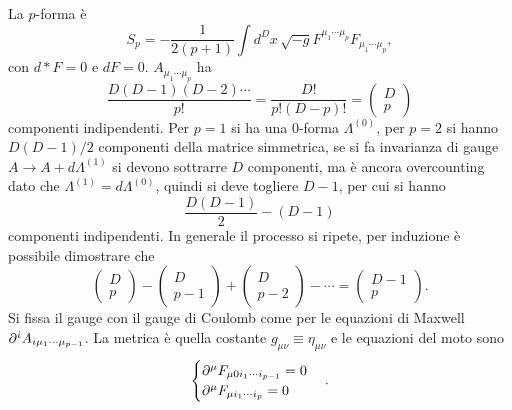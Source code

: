 La $p$-forma è 
\begin{equation}
    S_p = -\frac{1}{2(p + 1)}\int d^Dx\, \sqrt{-g}F^{\mu_1\cdots\mu_p}F_{\mu_1\cdots\mu_p},
\end{equation}
con $d*F = 0$ e $dF = 0$. $A_{\mu_1\cdots\mu_p}$ ha 
\begin{equation}
    \frac{D(D - 1)(D - 2)\cdots}{p!} = \frac{D!}{p!(D - p)!} = 
    \begin{pmatrix}
        D \\
        p
    \end{pmatrix}
\end{equation}
componenti indipendenti. Per $p=1$ si ha una $0$-forma $\Lambda^{(0)}$, per $p=2$ si hanno $D(D - 1)/2$ componenti della matrice simmetrica, se si fa invarianza di gauge $A \to A + d\Lambda^{(1)}$ si devono sottrarre $D$ componenti, ma è ancora overcounting dato che $\Lambda^{(1)} = d\Lambda^{(0)}$, quindi si deve togliere $D - 1$, per cui si hanno 
\begin{equation}
    \frac{D(D - 1)}{2} - (D - 1)
\end{equation}
componenti indipendenti. In generale il processo si ripete, per induzione è possibile dimostrare che 
\begin{equation}
    \begin{pmatrix}
        D \\
        p
    \end{pmatrix} -
    \begin{pmatrix}
        D \\
        p - 1
    \end{pmatrix} +
    \begin{pmatrix}
        D \\
        p - 2
    \end{pmatrix}
    - \cdots = 
    \begin{pmatrix}
        D - 1 \\
        p
    \end{pmatrix}.
\end{equation}
Si fissa il gauge con il gauge di Coulomb come per le equazioni di Maxwell $\partial^iA_{i\mu_1\cdots\mu_{p-1}}$. La metrica è quella costante $g_{\mu\nu} \equiv \eta_{\mu\nu}$ e le equazioni del moto sono 
\begin{equation}
    \begin{cases}
        \partial^\mu F_{\mu0i_1\cdots i_{p - 1}} = 0 \\
        \partial^\mu F_{\mu i_1\cdots i_p} = 0
    \end{cases}.
\end{equation}
